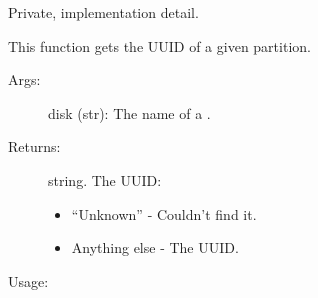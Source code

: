 \documentclass[letterpaper,10pt,english]{sphinxmanual}
\begin{document}
\begin{fulllineitems}
\label{\detokenize{linux:getdevinfo.linux.get_uuid}}
Private, implementation detail.

This function gets the UUID of a given partition.
\begin{description}
\item[{Args:}] \leavevmode
disk (str):   The name of a .

\item[{Returns:}] \leavevmode
string. The UUID:
\begin{itemize}
\item {} 
“Unknown”     - Couldn’t find it.

\item {} 
Anything else - The UUID.

\end{itemize}

\end{description}

Usage:

\begin{sphinxVerbatim}[commandchars=\\\{\}]
  
\end{sphinxVerbatim}

\end{fulllineitems}

\end{document}
